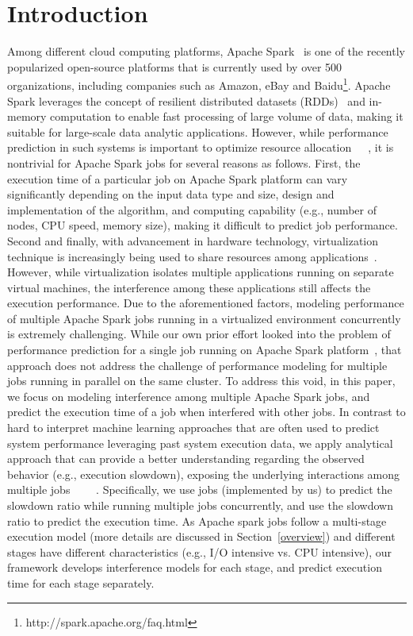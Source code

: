\section{Introduction}
\label{intro}
Among different cloud computing platforms, Apache Spark~\cite{spark} is one of the recently popularized open-source platforms that is currently used by over 500 organizations, including companies such as Amazon, eBay and Baidu\footnote{http://spark.apache.org/faq.html}. Apache Spark leverages the concept of resilient distributed datasets (RDDs)~\cite{rdd} and in-memory computation to enable fast processing of large volume of data, making it suitable for large-scale data analytic applications. However, while performance prediction in such systems is important to optimize resource allocation~\cite{khan2015hadoop}~\cite{cheng2015resource}~\cite{delimitrou2014quasar}, it is nontrivial for Apache Spark jobs for several reasons as follows. First, the execution time of a particular job on Apache Spark platform can vary significantly depending on the input data type and size, design and implementation of the algorithm, and computing capability (e.g., number of nodes, CPU speed, memory size), making it difficult to predict job performance. Second and finally, with advancement in hardware technology, virtualization technique is increasingly being used to share resources among applications~\cite{hybridmr}. However, while virtualization isolates multiple applications running on separate virtual machines, the interference among these applications still affects the execution performance. Due to the aforementioned factors, modeling performance of multiple Apache Spark jobs running in a virtualized environment concurrently is extremely challenging. While our own prior effort looked into the problem of performance prediction for a single job running on Apache Spark platform~\cite{wangperformance}, that approach does not address the challenge of performance modeling for multiple jobs running in parallel on the same cluster.
\noindent
To address this void, in this paper, we focus on modeling interference among multiple Apache Spark jobs, and predict the execution time of a job when interfered with other jobs.
In contrast to hard to interpret machine learning approaches that are often used to predict system performance leveraging past system execution data, we apply analytical approach that can provide a better understanding regarding the observed behavior (e.g., execution slowdown), exposing the underlying interactions among multiple jobs~\cite{ousterhout2015making}~\cite{noorshams2014automated}~\cite{zhu2012performance} ~\cite{lai2014io}. Specifically, we use jobs (implemented by us) to predict the slowdown ratio while running multiple jobs concurrently, and use the slowdown ratio to predict the execution time. As Apache spark jobs follow a multi-stage execution model (more details are discussed in Section~\ref{overview}) and different stages have different characteristics (e.g., I/O intensive vs. CPU intensive), our framework develops interference models for each stage, and predict execution time for each stage separately. 
